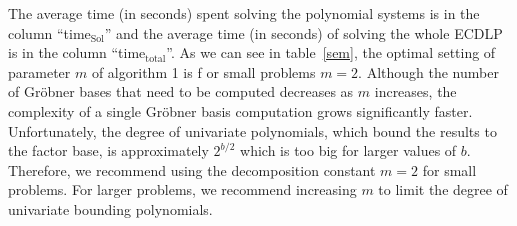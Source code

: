 \documentclass[thesis=M,english]{FITthesis}[2012/10/20]
\theoremstyle{remark}
\theoremstyle{definition}
\begin{document}
\noindent The average time (in seconds) spent solving the polynomial systems is in the column \enquote{time$_\text{Sol}$}  and the average time (in seconds) of solving the whole ECDLP is in the column \enquote{time$_\text{total}$}. As we can see in table~\ref{sem}, the optimal setting of parameter $m$ of algorithm 1 is f or small problems $m=2$. Although the number of Gröbner bases that need to be computed decreases as $m$ increases, the complexity of a single Gröbner basis computation grows significantly faster. Unfortunately, the degree of univariate polynomials, which bound the results to the factor base, is approximately $2^{b/2}$ which is too big for larger values of $b$. Therefore, we recommend using the decomposition constant $m=2$ for small problems. For larger problems, we recommend increasing $m$ to limit the degree of univariate bounding polynomials.
\end{document}

